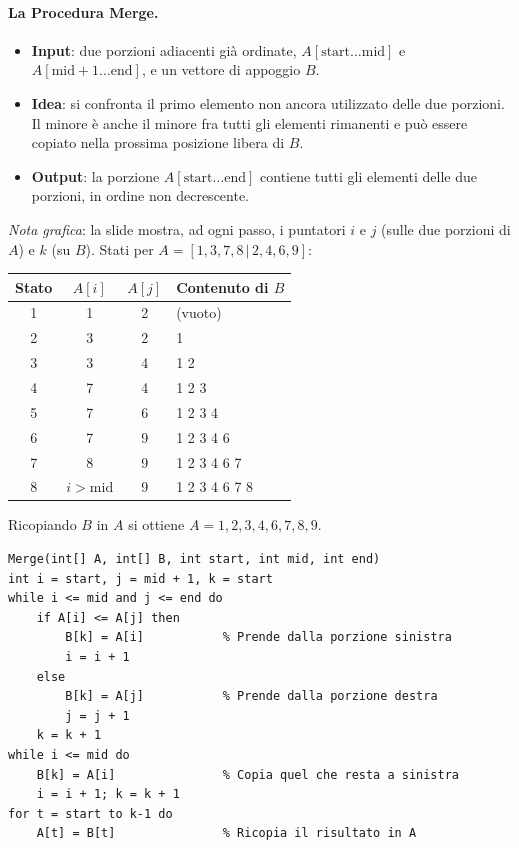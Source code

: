\documentclass[12pt, a4paper]{article}
\begin{document}
\paragraph{La Procedura Merge.}
\begin{itemize}
    \item \textbf{Input}: due porzioni adiacenti già ordinate, $A[\text{start}\ldots\text{mid}]$ e $A[\text{mid}+1\ldots\text{end}]$, e un vettore di appoggio $B$.
    \item \textbf{Idea}: si confronta il primo elemento non ancora utilizzato delle due porzioni. Il minore è anche il minore fra tutti gli elementi rimanenti e può essere copiato nella prossima posizione libera di $B$.
    \item \textbf{Output}: la porzione $A[\text{start}\ldots\text{end}]$ contiene tutti gli elementi delle due porzioni, in ordine non decrescente.
\end{itemize}

\textit{Nota grafica}: la slide mostra, ad ogni passo, i puntatori $i$ e $j$ (sulle due porzioni di $A$) e $k$ (su $B$). Stati per $A=[1,3,7,8\,|\,2,4,6,9]$:
\begin{center}
\begin{tabular}{c|cc|l}
\toprule
\textbf{Stato} & $A[i]$ & $A[j]$ & \textbf{Contenuto di $B$} \\
\midrule
1 & 1 & 2 & (vuoto) \\
2 & 3 & 2 & 1 \\
3 & 3 & 4 & 1 2 \\
4 & 7 & 4 & 1 2 3 \\
5 & 7 & 6 & 1 2 3 4 \\
6 & 7 & 9 & 1 2 3 4 6 \\
7 & 8 & 9 & 1 2 3 4 6 7 \\
8 & $i>\text{mid}$ & 9 & 1 2 3 4 6 7 8 \\
\bottomrule
\end{tabular}
\end{center}
Ricopiando $B$ in $A$ si ottiene $A = 1,2,3,4,6,7,8,9$.

\begin{verbatim}
Merge(int[] A, int[] B, int start, int mid, int end)
int i = start, j = mid + 1, k = start
while i <= mid and j <= end do
    if A[i] <= A[j] then
        B[k] = A[i]           % Prende dalla porzione sinistra
        i = i + 1
    else
        B[k] = A[j]           % Prende dalla porzione destra
        j = j + 1
    k = k + 1
while i <= mid do
    B[k] = A[i]               % Copia quel che resta a sinistra
    i = i + 1; k = k + 1
for t = start to k-1 do
    A[t] = B[t]               % Ricopia il risultato in A
\end{verbatim}
\end{document}
